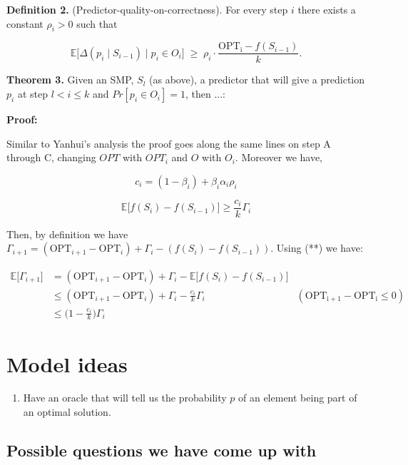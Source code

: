 \documentclass{article}
\begin{document}
\textbf{Definition 2.} (Predictor-quality-on-correctness). For every step $i$ there exists a constant $\rho_i>0$ such that

\[
\mathbb{E}\big[\Delta(p_i\mid S_{i-1}) \mid p_i\in O_i\big]
\;\ge\; \rho_i\cdot\frac{\mathrm{OPT_i}-f(S_{i-1})}{k}.
\] 

\textbf{Theorem 3.} Given an SMP, $S_l$ (as above), a predictor that will give a prediction $p_i$ at step $l < i \leq k$ and $Pr[p_i \in O_i] = 1$, then ...:


\textbf{Proof:}

Similar to Yanhui's analysis the proof goes along the same lines on step A through C, changing $OPT$ with $OPT_i$ and $O$ with $O_i$. Moreover we have,

\[
c_i = (1 - \beta_i) +\beta_i\alpha_i\rho_i \tag{*}
\]

\[
\mathbb{E}\big[f(S_i) - f(S_{i-1})\big] \geq \frac{c_i}{k} \Gamma_i \tag{**}
\]

Then, by definition we have $\Gamma_{i+1} = (\mathrm{OPT}_{i+1} - \mathrm{OPT}_{i}) +  \Gamma_i - (f(S_i) - f(S_{i-1}))$. Using (**) we have: 

\[
\begin{aligned}
\mathbb{E}\big[\Gamma_{i+1}\big] &= (\mathrm{OPT}_{i+1} - \mathrm{OPT}_{i}) + \Gamma_i - \mathbb{E}\big[f(S_i) - f(S_{i-1})\big] \\
    &\leq (\mathrm{OPT}_{i+1} - \mathrm{OPT}_{i}) + \Gamma_i - \frac{c_i}{k}\Gamma_i & (\mathrm{OPT_{i+1} - OPT_i} \leq 0) \\
    &\leq \Big(1 - \frac{c_i}{k}\Big)\Gamma_i
\end{aligned}
\]














\section{Model ideas}

\begin{enumerate}
    \item Have an oracle that will tell us the probability $p$ of an element being part of an optimal solution.
\end{enumerate}

\subsection{Possible questions we have come up with}
\end{document}
